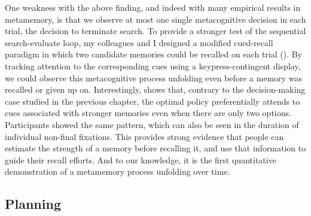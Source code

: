 \documentclass[11pt,a4paperpaper,]{article}
\begin{document}
One weakness with the above finding, and indeed with many empirical results in metamemory, is that we observe at most one single metacognitive decision in each trial, the decision to terminate search. To provide a stronger test of the sequential search-evaluate loop, my colleagues and I designed a modified cued-recall paradigm in which two candidate memories could be recalled on each trial (). By tracking attention to the corresponding cues using a keypress-contingent display, we could observe this metacognitive process unfolding even before a memory was recalled or given up on. Interestingly,  shows that, contrary to the decision-making case studied in the previous chapter, the optimal policy preferentially attends to cues associated with stronger memories even when there are only two options. Participants showed the same pattern, which can also be seen in the duration of individual non-final fixations. This provides strong evidence that people can estimate the strength of a memory before recalling it, and use that information to guide their recall efforts. And to our knowledge, it is the first quantitative demonstration of a metamemory process unfolding over time.


\subsection{Planning}
\end{document}
